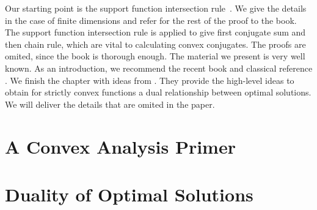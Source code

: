 \documentclass[11pt, a4paper, BCOR=10mm, DIV=11]{scrbook}
\theoremstyle{definition}
\theoremstyle{plain}
\begin{document}
Our starting point is 
the support function intersection rule~\cite[Theorem 4.23]{Mordukhovich2022}.
We give the details in the case of finite dimensions and refer for the rest of the proof to the book.
The support function intersection rule is applied to give first conjugate sum and then chain rule,
which are vital to calculating convex conjugates. The proofs are omited, since the book is thorough enough. 
The material we present is very well known.
As an introduction, we recommend the recent book \cite{Mordukhovich2022} and classical reference \cite{Rockafellar1970}.
We finish the chapter with ideas from \cite{Tseng1991}. 
They provide the high-level ideas to obtain for strictly convex
functions a dual relationship between optimal solutions.
We will deliver the details that are omited in the paper.
  \section{A Convex Analysis Primer}
  
%
  \section{Duality of Optimal Solutions}
  
\end{document}
